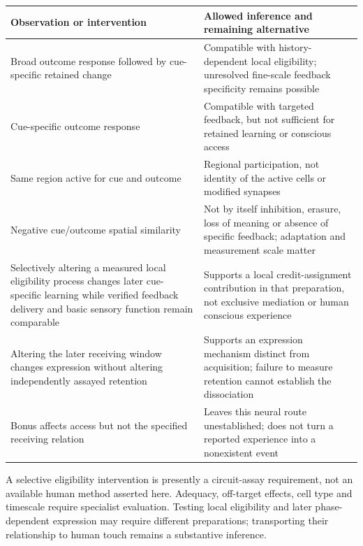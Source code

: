 \documentclass[
  american,
  11pt,
  letterpaper,
]{article}
\newcounter{none} %
\begin{document}
{\def\LTcaptype{none} %
\begin{longtable}[]{@{}
  >{\raggedright\arraybackslash}p{}
  >{\raggedright\arraybackslash}p{}@{}}
\toprule\noalign{}
\begin{minipage}[b]{\linewidth}\raggedright
Observation or intervention
\end{minipage} & \begin{minipage}[b]{\linewidth}\raggedright
Allowed inference and remaining alternative
\end{minipage} \\
\midrule\noalign{}
\endhead
\bottomrule\noalign{}
\endlastfoot
Broad outcome response followed by cue-specific retained change & Compatible with history-dependent local eligibility; unresolved fine-scale feedback specificity remains possible \\
Cue-specific outcome response & Compatible with targeted feedback, but not sufficient for retained learning or conscious access \\
Same region active for cue and outcome & Regional participation, not identity of the active cells or modified synapses \\
Negative cue/outcome spatial similarity & Not by itself inhibition, erasure, loss of meaning or absence of specific feedback; adaptation and measurement scale matter \\
Selectively altering a measured local eligibility process changes later cue-specific learning while verified feedback delivery and basic sensory function remain comparable & Supports a local credit-assignment contribution in that preparation, not exclusive mediation or human conscious experience \\
Altering the later receiving window changes expression without altering independently assayed retention & Supports an expression mechanism distinct from acquisition; failure to measure retention cannot establish the dissociation \\
Bonus affects access but not the specified receiving relation & Leaves this neural route unestablished; does not turn a reported experience into a nonexistent event \\
\end{longtable}
}

A selective eligibility intervention is presently a circuit-assay requirement, not an available human method asserted here. Adequacy, off-target effects, cell type and timescale require specialist evaluation. Testing local eligibility and later phase-dependent expression may require different preparations; transporting their relationship to human touch remains a substantive inference.
\end{document}
